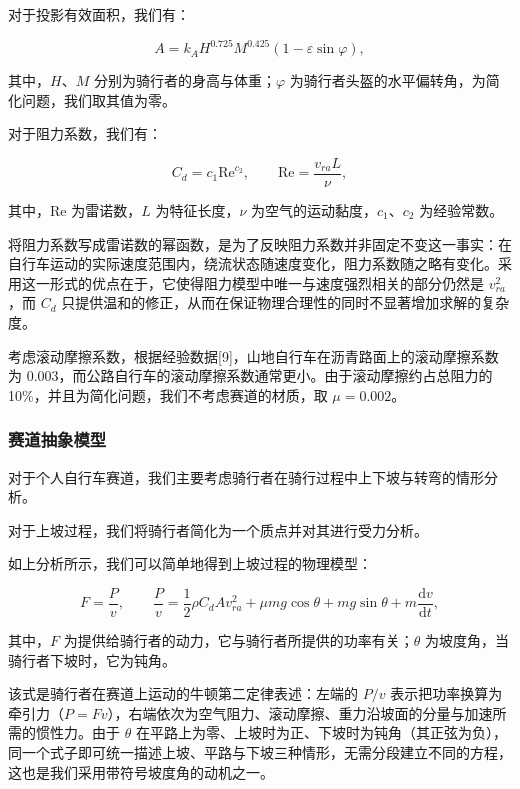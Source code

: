 \documentclass[11pt,a4paper]{ctexart}
\begin{document}
对于投影有效面积，我们有：

\begin{equation}
A = k_A H^{0.725} M^{0.425}\left(1 - \varepsilon \sin\varphi\right),
\end{equation}

其中，$H$、$M$ 分别为骑行者的身高与体重；$\varphi$ 为骑行者头盔的水平偏转角，为简化问题，我们取其值为零。

对于阻力系数，我们有：

\begin{equation}
C_d = c_1 \mathrm{Re}^{c_2}, \qquad \mathrm{Re} = \frac{v_{ra} L}{\nu},
\end{equation}

其中，$\mathrm{Re}$ 为雷诺数，$L$ 为特征长度，$\nu$ 为空气的运动黏度，$c_1$、$c_2$ 为经验常数。

将阻力系数写成雷诺数的幂函数，是为了反映阻力系数并非固定不变这一事实：在自行车运动的实际速度范围内，绕流状态随速度变化，阻力系数随之略有变化。采用这一形式的优点在于，它使得阻力模型中唯一与速度强烈相关的部分仍然是 $v_{ra}^2$，而 $C_d$ 只提供温和的修正，从而在保证物理合理性的同时不显著增加求解的复杂度。

考虑滚动摩擦系数，根据经验数据[9]，山地自行车在沥青路面上的滚动摩擦系数为 0.003，而公路自行车的滚动摩擦系数通常更小。由于滚动摩擦约占总阻力的 10\%，并且为简化问题，我们不考虑赛道的材质，取 $\mu = 0.002$。

\subsubsection{赛道抽象模型}

对于个人自行车赛道，我们主要考虑骑行者在骑行过程中上下坡与转弯的情形分析。

对于上坡过程，我们将骑行者简化为一个质点并对其进行受力分析。

如上分析所示，我们可以简单地得到上坡过程的物理模型：

\begin{equation}
F = \frac{P}{v}, \qquad \frac{P}{v} = \frac{1}{2}\rho C_d A v_{ra}^2 + \mu m g \cos\theta + m g \sin\theta + m\frac{\mathrm{d}v}{\mathrm{d}t},
\end{equation}

其中，$F$ 为提供给骑行者的动力，它与骑行者所提供的功率有关；$\theta$ 为坡度角，当骑行者下坡时，它为钝角。

该式是骑行者在赛道上运动的牛顿第二定律表述：左端的 $P/v$ 表示把功率换算为牵引力（$P = Fv$），右端依次为空气阻力、滚动摩擦、重力沿坡面的分量与加速所需的惯性力。由于 $\theta$ 在平路上为零、上坡时为正、下坡时为钝角（其正弦为负），同一个式子即可统一描述上坡、平路与下坡三种情形，无需分段建立不同的方程，这也是我们采用带符号坡度角的动机之一。
\end{document}
